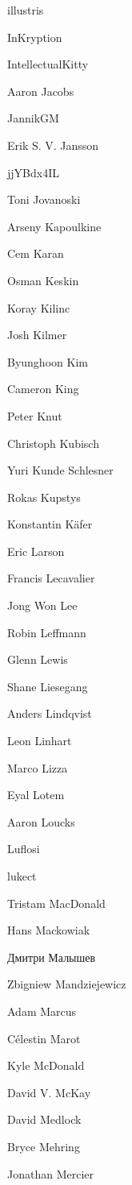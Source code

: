 \begin{DoxyItemize}
\item illustris
\item In\+Kryption
\item Intellectual\+Kitty
\item Aaron Jacobs
\item Jannik\+GM
\item Erik S. V. Jansson
\item jj\+YBdx4\+IL
\item Toni Jovanoski
\item Arseny Kapoulkine
\item Cem Karan
\item Osman Keskin
\item Koray Kilinc
\item Josh Kilmer
\item Byunghoon Kim
\item Cameron King
\item Peter Knut
\item Christoph Kubisch
\item Yuri Kunde Schlesner
\item Rokas Kupstys
\item Konstantin Käfer
\item Eric Larson
\item Francis Lecavalier
\item Jong Won Lee
\item Robin Leffmann
\item Glenn Lewis
\item Shane Liesegang
\item Anders Lindqvist
\item Leon Linhart
\item Marco Lizza
\item Eyal Lotem
\item Aaron Loucks
\item Luflosi
\item lukect
\item Tristam Mac\+Donald
\item Hans Mackowiak
\item Дмитри Малышев
\item Zbigniew Mandziejewicz
\item Adam Marcus
\item Célestin Marot
\item Kyle Mc\+Donald
\item David V. Mc\+Kay
\item David Medlock
\item Bryce Mehring
\item Jonathan Mercier

\end{DoxyItemize}
